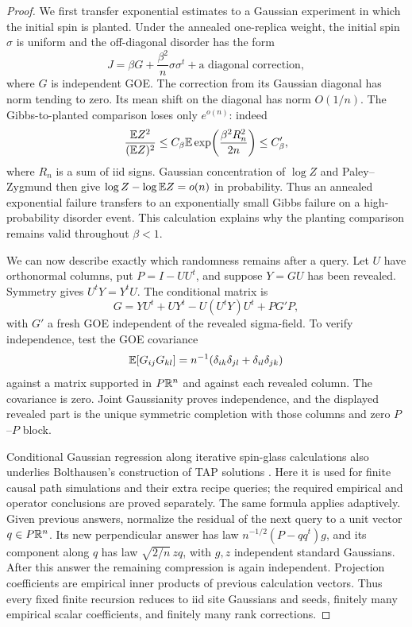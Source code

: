 \begin{proof}
We first transfer exponential estimates to a Gaussian experiment in
which the initial spin is planted.  Under the annealed one-replica
weight, the initial spin $\sigma$ is uniform and the off-diagonal
disorder has the form
\[
 J=\beta G+\frac{\beta^2}{n}\sigma\sigma^t
                     +\text{a diagonal correction},
\]
where $G$ is independent GOE.  The correction from its Gaussian
diagonal has norm tending to zero.  Its mean shift on the diagonal
has norm $O(1/n)$.  The Gibbs-to-planted comparison loses only
$e^{o(n)}$: indeed
\[
 \frac{\mathbb E Z^2}{(\mathbb E Z)^2}
 \le C_\beta\mathbb E\exp\!\left(\frac{\beta^2R_n^2}{2n}\right)
 \le C'_\beta,
\]
where $R_n$ is a sum of iid signs.  Gaussian concentration of $\log Z$
and Paley--Zygmund then give
$\log Z-\log\mathbb E Z=o(n)$ in probability.  Thus an annealed exponential
failure transfers to an exponentially small Gibbs failure on a
high-probability disorder event.  This calculation explains why the planting comparison remains valid
throughout $\beta<1$.

We can now describe exactly which randomness remains after a query.
Let $U$ have orthonormal columns, put $P=I-UU^t$, and suppose
$Y=GU$ has been revealed.  Symmetry gives $U^tY=Y^tU$.  The
conditional matrix is
\begin{equation}
 G=YU^t+UY^t-U(U^tY)U^t+PG'P,
 \label{eq:path-regression-formula}
\end{equation}
with $G'$ a fresh GOE independent of the revealed sigma-field.
To verify independence, test the GOE covariance
\[
 \mathbb E[G_{ij}G_{kl}]=n^{-1}
       (\delta_{ik}\delta_{jl}+\delta_{il}\delta_{jk})
\]
against a matrix supported in $P\mathbb R^n$ and against each revealed
column.  The covariance is zero.  Joint Gaussianity proves
independence, and the displayed revealed part is the unique symmetric
completion with those columns and zero $P$--$P$ block.

Conditional Gaussian regression along iterative spin-glass calculations
also underlies Bolthausen's construction of TAP solutions
\cite[Sections~2--3 of the arXiv version]{Bolthausen2014}.
Here it is used for finite causal
path simulations and their extra recipe queries; the required empirical
and operator conclusions are proved separately. The same formula applies
adaptively.  Given previous answers, normalize
the residual of the next query to a unit vector $q\in P\mathbb R^n$.
Its new perpendicular answer has law
$n^{-1/2}(P-qq^t)g$, and its component along $q$ has law
$\sqrt{2/n}\,zq$, with $g,z$ independent standard Gaussians.
After this answer the remaining compression is again independent.
Projection coefficients are empirical inner products of previous
calculation vectors.  Thus every fixed finite recursion reduces to
iid site Gaussians and seeds, finitely many empirical scalar
coefficients, and finitely many rank corrections.


\end{proof}

